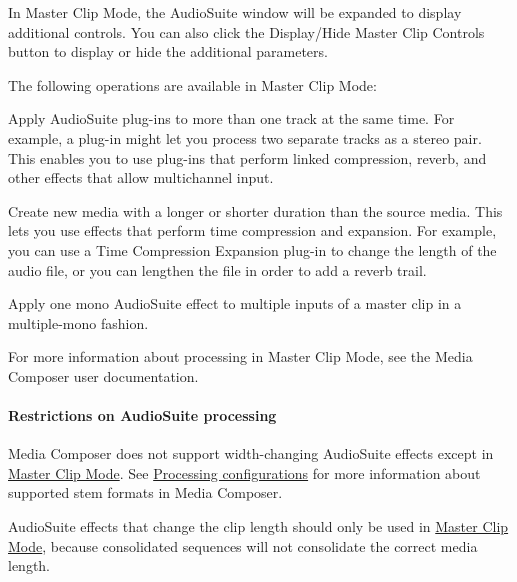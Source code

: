 In Master Clip Mode, the Audio\+Suite window will be expanded to display additional controls. You can also click the Display/\+Hide Master Clip Controls button to display or hide the additional parameters.

The following operations are available in Master Clip Mode\+: 
\begin{DoxyItemize}
\item Apply Audio\+Suite plug-\/ins to more than one track at the same time. For example, a plug-\/in might let you process two separate tracks as a stereo pair. This enables you to use plug-\/ins that perform linked compression, reverb, and other effects that allow multichannel input.  
\item Create new media with a longer or shorter duration than the source media. This lets you use effects that perform time compression and expansion. For example, you can use a Time Compression Expansion plug-\/in to change the length of the audio file, or you can lengthen the file in order to add a reverb trail.  
\item Apply one mono Audio\+Suite effect to multiple inputs of a master clip in a multiple-\/mono fashion.  
\end{DoxyItemize}

For more information about processing in Master Clip Mode, see the Media Composer user documentation.

\hypertarget{a00361_subsubsection__media_composer_guide__audiosuite_restrictions}{}\paragraph{Restrictions on Audio\+Suite processing}\label{a00361_subsubsection__media_composer_guide__audiosuite_restrictions}
 
\begin{DoxyItemize}
\item Media Composer does not support width-\/changing Audio\+Suite effects except in \hyperlink{a00361_subsubsection__media_composer_guide__audiosuite_master_clip_mode}{Master Clip Mode}. See \hyperlink{a00361_subsection__aax_media_composer_guide__features__processing}{Processing configurations} for more information about supported stem formats in Media Composer.  
\item Audio\+Suite effects that change the clip length should only be used in \hyperlink{a00361_subsubsection__media_composer_guide__audiosuite_master_clip_mode}{Master Clip Mode}, because consolidated sequences will not consolidate the correct media length. 
\end{DoxyItemize}

